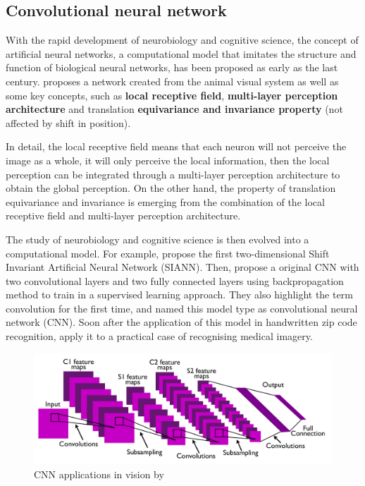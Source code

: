 \subsection{Convolutional neural network} %
With the rapid development of neurobiology and cognitive science, the concept of artificial neural networks, a computational model that imitates the structure and function of biological neural networks, has been proposed as early as the last century.
\citet{fukushima1980neocognitron} proposes a network created from the animal visual system as well as some key concepts, such as \textbf{local receptive field}, \textbf{multi-layer perception architecture} and translation \textbf{equivariance and invariance property} (not affected by shift in position).

In detail, the local receptive field means that each neuron will not perceive the image as a whole, it will only perceive the local information, then the local perception can be integrated through a multi-layer perception architecture to obtain the global perception.
On the other hand, the property of translation equivariance and invariance is emerging from the combination of the local receptive field and multi-layer perception architecture.

The study of neurobiology and cognitive science is then evolved into a computational model. For example, \citet{zhang1988shift} propose the first two-dimensional Shift Invariant Artificial Neural Network (SIANN).
Then, \citet{lecun1989backpropagation} propose a original CNN with two convolutional layers and two fully connected layers using backpropagation method to train in a supervised learning approach.
They also highlight the term convolution for the first time, and named this model type as convolutional neural network (CNN).
Soon after the application of this model in handwritten zip code recognition, \citet{zhang1994computerized} apply it to a practical case of recognising medical imagery.

\begin{figure}[ht!]
    \centering
    \includegraphics[width=\textwidth]{literature/imgs/ext-lecun-cnn-arch.png}
    \caption{CNN applications in vision by \citet{lecun2010convolutional}}
    \label{fig:ext-lecun-cnn-arch}
\end{figure}

